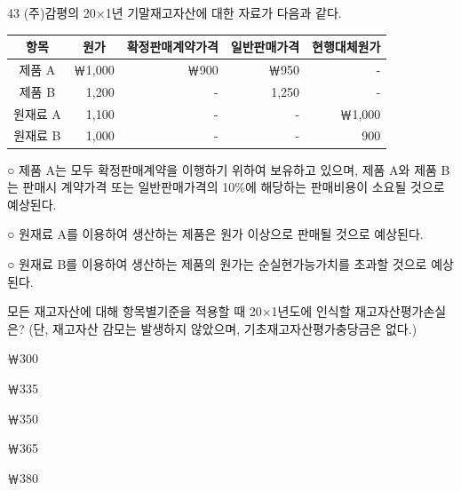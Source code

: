 \begin{question}{43}
(주)감평의 20×1년 기말재고자산에 대한 자료가 다음과 같다.
\par{\small\centering\begin{tabular}{|c|r|r|r|r|}\hline
항목 & \multicolumn{1}{c|}{원가} & \multicolumn{1}{c|}{확정판매계약가격} & \multicolumn{1}{c|}{일반판매가격} & \multicolumn{1}{c|}{현행대체원가} \tabularnewline\hline
제품 A & ￦1,000 & ￦900 & ￦950 & - \tabularnewline\hline
제품 B & 1,200 & - & 1,250 & - \tabularnewline\hline
원재료 A & 1,100 & - & - & ￦1,000 \tabularnewline\hline
원재료 B & 1,000 & - & - & 900 \tabularnewline\hline
\end{tabular}\par}
\begin{framedtext}
○ 제품 A는 모두 확정판매계약을 이행하기 위하여 보유하고 있으며, 제품 A와 제품 B는 판매시 계약가격 또는 일반판매가격의 10\%에 해당하는 판매비용이 소요될 것으로 예상된다. \par
○ 원재료 A를 이용하여 생산하는 제품은 원가 이상으로 판매될 것으로 예상된다. \par
○ 원재료 B를 이용하여 생산하는 제품의 원가는 순실현가능가치를 초과할 것으로 예상된다.
\end{framedtext}
모든 재고자산에 대해 항목별기준을 적용할 때 20×1년도에 인식할 재고자산평가손실은? (단, 재고자산 감모는 발생하지 않았으며, 기초재고자산평가충당금은 없다.)
\begin{choices}
  \item ￦300
  \item ￦335
  \item ￦350
  \item ￦365
  \item ￦380
\end{choices}
\end{question}
